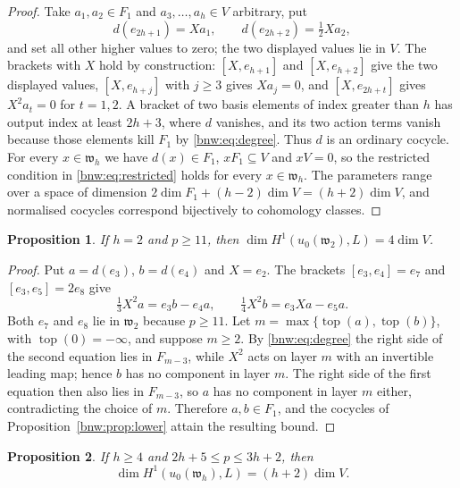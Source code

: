\documentclass[11pt,reqno]{amsart}
\newtheorem{proposition}[proposition]{Proposition}
\theoremstyle{definition}
\theoremstyle{remark}
\theoremstyle{definition}
\begin{document}
\begin{proof}
Take $a_1,a_2\in F_1$ and $a_3,\ldots,a_h\in V$ arbitrary, put
\[
d(e_{2h+1})=Xa_1,\qquad d(e_{2h+2})=\tfrac12Xa_2,
\]
and set all other higher values to zero; the two displayed values lie
in $V$. The brackets with $X$ hold by construction: $[X,e_{h+1}]$ and
$[X,e_{h+2}]$ give the two displayed values, $[X,e_{h+j}]$ with
$j\ge3$ gives $Xa_j=0$, and $[X,e_{2h+t}]$ gives $X^2a_t=0$ for
$t=1,2$. A bracket of two basis
elements of index greater than $h$ has output index at least $2h+3$,
where $d$ vanishes, and its two action terms vanish because those
elements kill $F_1$ by \eqref{bnw:eq:degree}. Thus $d$ is an ordinary
cocycle. For every $x\in\mathfrak{w}_h$ we have $d(x)\in F_1$,
$xF_1\subseteq V$ and $xV=0$, so the restricted condition in
\eqref{bnw:eq:restricted} holds for every $x\in\mathfrak w_h$. The parameters range over a space of dimension
$2\dim F_1+(h-2)\dim V=(h+2)\dim V$, and normalised cocycles correspond
bijectively to cohomology classes.
\end{proof}

\begin{proposition}\label{bnw:prop:h2}
If $h=2$ and $p\ge11$, then $\dim H^1(u_0(\mathfrak{w}_2),L)=4\dim V$.
\end{proposition}

\begin{proof}
Put $a=d(e_3)$, $b=d(e_4)$ and $X=e_2$. The brackets
$[e_3,e_4]=e_7$ and $[e_3,e_5]=2e_8$ give
\[
\tfrac13X^2a=e_3b-e_4a,\qquad \tfrac14X^2b=e_3Xa-e_5a.
\]
Both $e_7$ and $e_8$ lie in $\mathfrak{w}_2$ because $p\ge11$. Let
$m=\max\{\operatorname{top}(a),\operatorname{top}(b)\}$, with $\operatorname{top}(0)=-\infty$, and
suppose $m\ge2$. By \eqref{bnw:eq:degree} the right side of the second
equation lies in $F_{m-3}$, while $X^2$ acts on layer $m$ with an
invertible leading map; hence $b$ has no component in layer $m$. The
right side of the first equation then also lies in $F_{m-3}$, so $a$
has no component in layer $m$ either, contradicting the choice of $m$.
Therefore $a,b\in F_1$, and the cocycles of
Proposition~\ref{bnw:prop:lower} attain the resulting bound.
\end{proof}

\begin{proposition}\label{bnw:prop:two-step}
If $h\ge4$ and $2h+5\le p\le3h+2$, then
\[
 \dim H^1(u_0(\mathfrak{w}_h),L)=(h+2)\dim V.
\]
\end{proposition}
\end{document}
